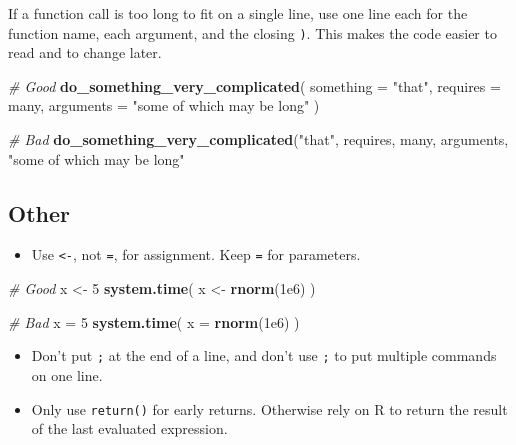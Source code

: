 \documentclass[]{book}
\newenvironment{Shaded}{\begin{snugshade}}{\end{snugshade}}
\newcommand{\KeywordTok}[1]{\textcolor[rgb]{0.13,0.29,0.53}{\textbf{#1}}}
\newcommand{\DataTypeTok}[1]{\textcolor[rgb]{0.13,0.29,0.53}{#1}}
\newcommand{\DecValTok}[1]{\textcolor[rgb]{0.00,0.00,0.81}{#1}}
\newcommand{\FloatTok}[1]{\textcolor[rgb]{0.00,0.00,0.81}{#1}}
\newcommand{\StringTok}[1]{\textcolor[rgb]{0.31,0.60,0.02}{#1}}
\newcommand{\CommentTok}[1]{\textcolor[rgb]{0.56,0.35,0.01}{\textit{#1}}}
\newcommand{\NormalTok}[1]{#1}
\providecommand{\tightlist}{%
  \setlength{\itemsep}{0pt}\setlength{\parskip}{0pt}}
\theoremstyle{definition}
\theoremstyle{definition}
\theoremstyle{definition}
\theoremstyle{remark}
\begin{document}
If a function call is too long to fit on a single line, use one line
each for the function name, each argument, and the closing \texttt{)}.
This makes the code easier to read and to change later.

\begin{Shaded}
\begin{Highlighting}[]
\CommentTok{# Good}
\KeywordTok{do_something_very_complicated}\NormalTok{(}
  \DataTypeTok{something =} \StringTok{"that"}\NormalTok{,}
  \DataTypeTok{requires  =}\NormalTok{ many,}
  \DataTypeTok{arguments =} \StringTok{"some of which may be long"}
\NormalTok{)}

\CommentTok{# Bad}
\KeywordTok{do_something_very_complicated}\NormalTok{(}\StringTok{"that"}\NormalTok{, requires, many, arguments,}
                              \StringTok{"some of which may be long"}
\end{Highlighting}
\end{Shaded}

\subsection{Other}\label{other}

\begin{itemize}
\tightlist
\item
  Use \texttt{\textless{}-}, not \texttt{=}, for assignment. Keep
  \texttt{=} for parameters.
\end{itemize}

\begin{Shaded}
\begin{Highlighting}[]
\CommentTok{# Good}
\NormalTok{x <-}\StringTok{ }\DecValTok{5}
\KeywordTok{system.time}\NormalTok{(}
\NormalTok{  x <-}\StringTok{ }\KeywordTok{rnorm}\NormalTok{(}\FloatTok{1e6}\NormalTok{)}
\NormalTok{)}

\CommentTok{# Bad}
\NormalTok{x =}\StringTok{ }\DecValTok{5}
\KeywordTok{system.time}\NormalTok{(}
  \DataTypeTok{x =} \KeywordTok{rnorm}\NormalTok{(}\FloatTok{1e6}\NormalTok{)}
\NormalTok{)}
\end{Highlighting}
\end{Shaded}

\begin{itemize}
\item
  Don't put \texttt{;} at the end of a line, and don't use \texttt{;} to
  put multiple commands on one line.
\item
  Only use \texttt{return()} for early returns. Otherwise rely on R to
  return the result of the last evaluated expression.
\end{itemize}
\end{document}
